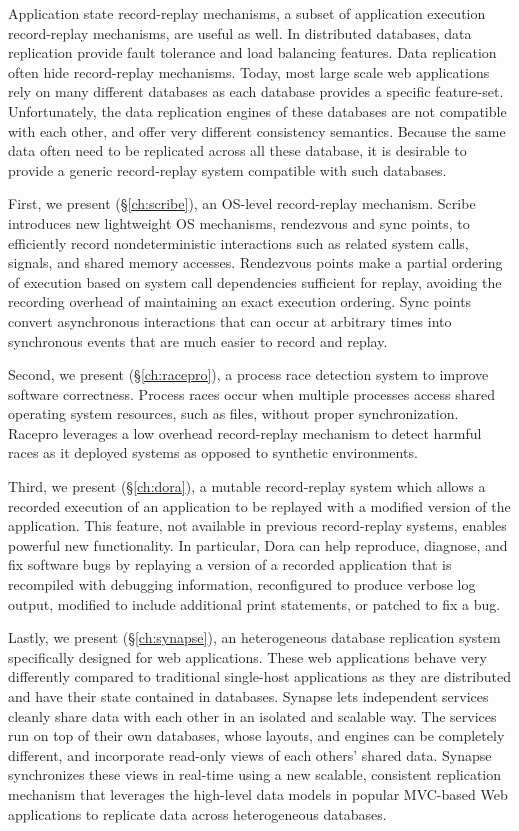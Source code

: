 Application state record-replay mechanisms, a subset of application execution
record-replay mechanisms, are useful as well.  In distributed
databases, data replication provide fault tolerance and load balancing
features. Data replication often hide record-replay mechanisms.
Today, most large scale web applications rely on many different databases as
each database provides a specific feature-set. Unfortunately, the data replication
engines of these databases are not compatible with each other, and offer very
different consistency semantics. Because the same data often need to be
replicated across all these database, it is desirable to provide a generic
record-replay system compatible with such databases.

First, we present \scribe (\S\ref{ch:scribe}), an OS-level record-replay
mechanism.  Scribe introduces new lightweight OS mechanisms, rendezvous and sync
points, to efficiently record nondeterministic interactions such as related
system calls, signals, and shared memory accesses. Rendezvous points make a
partial ordering of execution based on system call dependencies sufficient for
replay, avoiding the recording overhead of maintaining an exact execution
ordering.  Sync points convert asynchronous interactions that can occur at
arbitrary times into synchronous events that are much easier to record and
replay.

Second, we present \racepro (\S\ref{ch:racepro}), a process race detection
system to improve software correctness. Process races occur when multiple
processes access shared operating system resources, such as files, without
proper synchronization.  Racepro leverages a low overhead record-replay
mechanism to detect harmful races as it deployed systems as opposed to synthetic
environments.

Third, we present \dora (\S\ref{ch:dora}), a mutable record-replay system which
allows a recorded execution of an application to be replayed with a modified
version of the application. This feature, not available in previous
record-replay systems, enables powerful new functionality. In particular, Dora
can help reproduce, diagnose, and fix software bugs by replaying a version of a
recorded application that is recompiled with debugging information, reconfigured
to produce verbose log output, modified to include additional print statements,
or patched to fix a bug.

Lastly, we present \synapse (\S\ref{ch:synapse}), an heterogeneous database
replication system specifically designed for web applications. These web
applications behave very differently compared to traditional single-host
applications as they are distributed and have their state contained in
databases.  Synapse lets independent services cleanly share data with each other
in an isolated and scalable way. The services run on top of their own databases,
whose layouts, and engines can be completely different, and incorporate
read-only views of each others' shared data.  Synapse synchronizes these views
in real-time using a new scalable, consistent replication mechanism that
leverages the high-level data models in popular MVC-based Web applications to
replicate data across heterogeneous databases.
